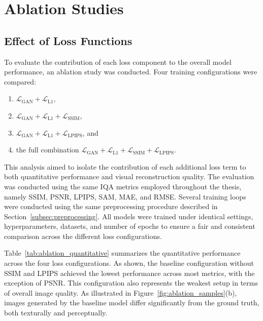 \chapter{Ablation Studies}
\section{Effect of Loss Functions}
\label{subsec:ablation_loss}

To evaluate the contribution of each loss component to the overall model performance, an ablation study was conducted. Four training configurations were compared:
\begin{enumerate}
    \item $\mathcal{L}_{\text{GAN}} + \mathcal{L}_{\text{L1}}$,
    \item $\mathcal{L}_{\text{GAN}} + \mathcal{L}_{\text{L1}} + \mathcal{L}_{\text{SSIM}}$,
    \item $\mathcal{L}_{\text{GAN}} + \mathcal{L}_{\text{L1}} + \mathcal{L}_{\text{LPIPS}}$, and
    \item the full combination $\mathcal{L}_{\text{GAN}} + \mathcal{L}_{\text{L1}} + \mathcal{L}_{\text{SSIM}} + \mathcal{L}_{\text{LPIPS}}$.
\end{enumerate}
This analysis aimed to isolate the contribution of each additional loss term to both quantitative performance and visual reconstruction quality. The evaluation was conducted using the same IQA metrics employed throughout the thesis, namely SSIM, PSNR, LPIPS, SAM, MAE, and RMSE. Several training loops were conducted using the same preprocessing procedure described in Section~\ref{subsec:preprocessing}. All models were trained under identical settings, hyperparameters, datasets, and number of epochs to ensure a fair and consistent comparison across the different loss configurations.

Table~\ref{tab:ablation_quantitative} summarizes the quantitative performance across the four loss configurations. As shown, the baseline configuration without SSIM and LPIPS achieved the lowest performance across most metrics, with the exception of PSNR. This configuration also represents the weakest setup in terms of overall image quality. As illustrated in Figure~\ref{fig:ablation_samples}(b), images generated by the baseline model differ significantly from the ground truth, both texturally and perceptually. 

